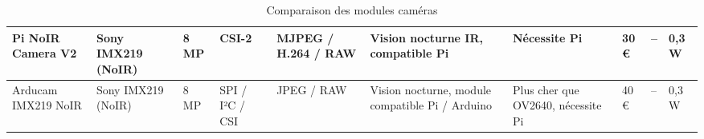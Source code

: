 \begin{landscape}
\begin{table}[!ht]
\begin{tabularx}{\textwidth}{
            |p{3cm}|p{2.5cm}|p{2.5cm}|p{2cm}|
            p{2.5cm}|p{3cm}|p{3cm}|p{1.5cm}|p{2cm}|p{2cm}|
            }
            \hline
            Pi NoIR Camera V2             & Sony IMX219 (NoIR)       & 8 MP                      & CSI-2              & MJPEG / H.264 / RAW & Vision nocturne IR, compatible Pi                        & Nécessite Pi                                 & 30 € & --   & 0,3 W  \\
            \hline
            Arducam IMX219 NoIR           & Sony IMX219 (NoIR)       & 8 MP                      & SPI / I²C / CSI    & JPEG / RAW          & Vision nocturne, module compatible Pi / Arduino          & Plus cher que OV2640, nécessite Pi           & 40 € & --   & 0,3 W  \\
            \hline
        \end{tabularx}
        \caption{Comparaison des modules caméras}
    \end{table}


\end{landscape}
